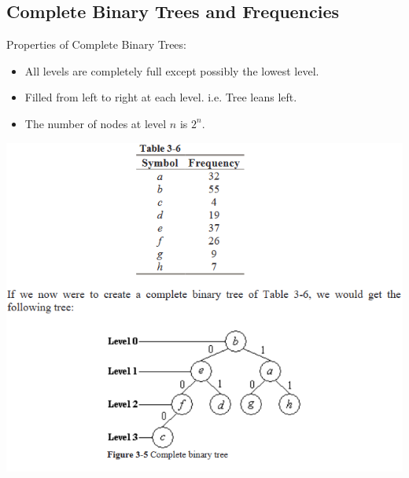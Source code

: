 \documentclass{beamer}
\begin{document}
\subsection{Complete Binary Trees and Frequencies}
\begin{frame}
Properties of Complete Binary Trees:
\begin{itemize}
\item All levels are completely full except possibly the lowest level.
\item Filled from left to right at each level. i.e. Tree leans left.
\item The number of nodes at level $n$ is $2^n$.
\end{itemize}
\end{frame}

\begin{frame}
\begin{center}
\includegraphics[scale=0.55]{example}
\end{center}
\end{frame}
\end{document}
